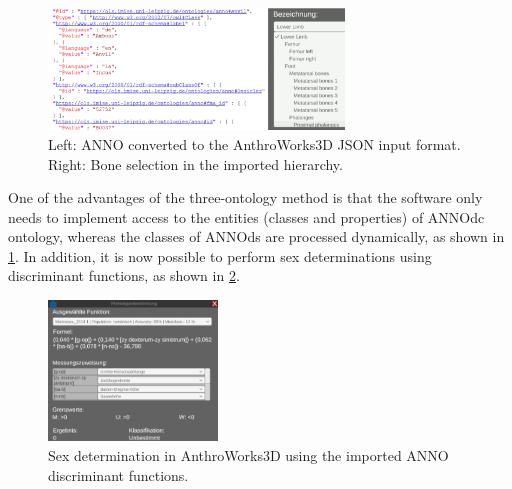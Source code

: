 \documentclass[sw]{iosart2x}
\newcommand{\aw}{AnthroWorks3D}
\begin{document}
\begin{figure}[h]
\includegraphics[width=0.7\textwidth]{img/json.png}
\caption{Left: ANNO converted to the \aw{} JSON input format. Right: Bone selection in the imported hierarchy.}
\label{fig:json}
\end{figure}

One of the advantages of the three-ontology method is that the software only needs to implement access to the entities (classes and properties) of ANNOdc ontology, whereas the classes of ANNOds are processed dynamically, as shown in \cref{fig:json}.
%
In addition, it is now possible to perform sex determinations using discriminant functions, as shown in \cref{fig:function}.

\begin{figure}[h]
\includegraphics[width=0.4\textwidth]{img/function.png}
\caption{Sex determination in \aw{} using the imported ANNO discriminant functions.}
\label{fig:function}
\end{figure}
\end{document}
